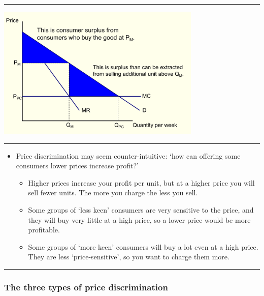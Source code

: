 \documentclass[]{article}
\providecommand{\tightlist}{%
  \setlength{\itemsep}{0pt}\setlength{\parskip}{0pt}}
\begin{document}
\begin{center}\rule{0.5\linewidth}{\linethickness}\end{center}

\includegraphics[height=2.5in]{picsfigs/ppd2.png}

\begin{center}\rule{0.5\linewidth}{\linethickness}\end{center}

\begin{itemize}
\tightlist
\item
  Price discrimination may seem counter-intuitive: `how can offering some consumers lower prices increase profit?'

  \begin{itemize}
  \tightlist
  \item
    Higher prices increase your profit per unit, but at a higher price you will sell fewer units. The more you charge the less you sell.
  \item
    Some groups of `less keen' consumers are very sensitive to the price, and they will buy very little at a high price, so a lower price would be more profitable.
  \item
    Some groups of `more keen' consumers will buy a lot even at a high price. They are less `price-sensitive', so you want to charge them more.
  \end{itemize}
\end{itemize}

\begin{center}\rule{0.5\linewidth}{\linethickness}\end{center}

\hypertarget{the-three-types-of-price-discrimination}{%
\subsubsection{The three types of price discrimination}\label{the-three-types-of-price-discrimination}}
\end{document}
